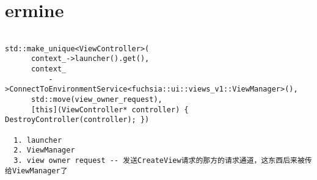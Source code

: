 \section{ermine}

\begin{verbatim}

std::make_unique<ViewController>(
      context_->launcher().get(),
      context_
          ->ConnectToEnvironmentService<fuchsia::ui::views_v1::ViewManager>(),
      std::move(view_owner_request),
      [this](ViewController* controller) { DestroyController(controller); })

  1. launcher
  2. ViewManager
  3. view owner request -- 发送CreateView请求的那方的请求通道，这东西后来被传给ViewManager了



\end{verbatim}